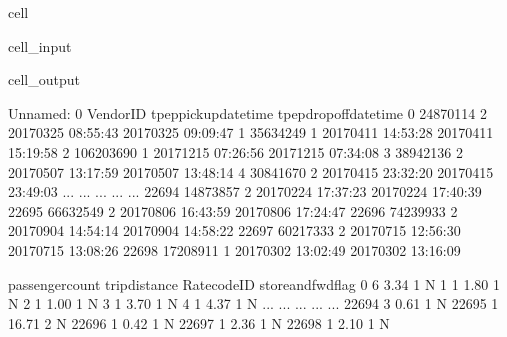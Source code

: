 \documentclass[letterpaper,10pt,english]{sphinxmanual}
\begin{document}
\begin{sphinxuseclass}{cell}
\begin{sphinxuseclass}{cell_input}
\begin{sphinxVerbatim}[commandchars=\\\{\}]
\end{sphinxVerbatim}

\end{sphinxuseclass}
\begin{sphinxuseclass}{cell_output}
\begin{sphinxVerbatim}[commandchars=\\\{\}]
       Unnamed: 0  VendorID tpep\PYGZus{}pickup\PYGZus{}datetime tpep\PYGZus{}dropoff\PYGZus{}datetime  \PYGZbs{}
0        24870114         2  2017\PYGZhy{}03\PYGZhy{}25 08:55:43   2017\PYGZhy{}03\PYGZhy{}25 09:09:47   
1        35634249         1  2017\PYGZhy{}04\PYGZhy{}11 14:53:28   2017\PYGZhy{}04\PYGZhy{}11 15:19:58   
2       106203690         1  2017\PYGZhy{}12\PYGZhy{}15 07:26:56   2017\PYGZhy{}12\PYGZhy{}15 07:34:08   
3        38942136         2  2017\PYGZhy{}05\PYGZhy{}07 13:17:59   2017\PYGZhy{}05\PYGZhy{}07 13:48:14   
4        30841670         2  2017\PYGZhy{}04\PYGZhy{}15 23:32:20   2017\PYGZhy{}04\PYGZhy{}15 23:49:03   
...           ...       ...                  ...                   ...   
22694    14873857         2  2017\PYGZhy{}02\PYGZhy{}24 17:37:23   2017\PYGZhy{}02\PYGZhy{}24 17:40:39   
22695    66632549         2  2017\PYGZhy{}08\PYGZhy{}06 16:43:59   2017\PYGZhy{}08\PYGZhy{}06 17:24:47   
22696    74239933         2  2017\PYGZhy{}09\PYGZhy{}04 14:54:14   2017\PYGZhy{}09\PYGZhy{}04 14:58:22   
22697    60217333         2  2017\PYGZhy{}07\PYGZhy{}15 12:56:30   2017\PYGZhy{}07\PYGZhy{}15 13:08:26   
22698    17208911         1  2017\PYGZhy{}03\PYGZhy{}02 13:02:49   2017\PYGZhy{}03\PYGZhy{}02 13:16:09   

       passenger\PYGZus{}count  trip\PYGZus{}distance  RatecodeID store\PYGZus{}and\PYGZus{}fwd\PYGZus{}flag  \PYGZbs{}
0                    6           3.34           1                  N   
1                    1           1.80           1                  N   
2                    1           1.00           1                  N   
3                    1           3.70           1                  N   
4                    1           4.37           1                  N   
...                ...            ...         ...                ...   
22694                3           0.61           1                  N   
22695                1          16.71           2                  N   
22696                1           0.42           1                  N   
22697                1           2.36           1                  N   
22698                1           2.10           1                  N   


\end{sphinxVerbatim}
\end{sphinxuseclass}
\end{sphinxuseclass}
\end{document}
